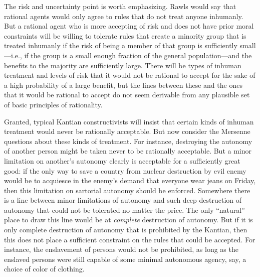 The risk and uncertainty point is worth emphasizing. Rawls would say that rational agents would only agree to 
rules that do not treat anyone inhumanly. But a rational agent who is more accepting of
risk and does not have prior moral constraints will be willing to tolerate rules that create a minority group that is treated inhumanly if the risk of being a member of 
that group is sufficiently small---i.e., if the group is a small enough fraction of the general population---and the benefits 
to the majority are sufficiently large. There will be types of inhuman treatment and levels of risk that it would not be 
rational to accept for the sake of a high probability of a large benefit, but the lines between these and the ones that it would 
be rational to accept do not seem derivable from any plausible set of basic principles of rationality. 

Granted, typical Kantian constructivists will insist that certain kinds of inhuman treatment would never be rationally acceptable. But 
now consider the Mersenne questions about these kinds of treatment. For instance, destroying the autonomy of another person might
be taken never to be rationally acceptable. But a minor limitation on another's autonomy clearly is acceptable for a sufficiently
great good: if the only way to save a country from nuclear destruction by evil enemy would be to acquiesce in the enemy's demand 
that everyone wear jeans on Friday, then this limitation on sartorial autonomy should be enforced. Somewhere there is a line between
minor limitations of autonomy and such deep destruction of autonomy that could not be tolerated no matter the price. The only
``natural'' place to draw this line would be at \textit{complete} destruction of autonomy. But if it is only complete destruction
of autonomy that is prohibited by the Kantian, then this does not place a sufficient constraint on the rules that could
be accepted. For instance, the enslavement of persons would not be prohibited, as long as the enslaved persons were still capable of some minimal autonomous agency, say, a choice of color of clothing.

